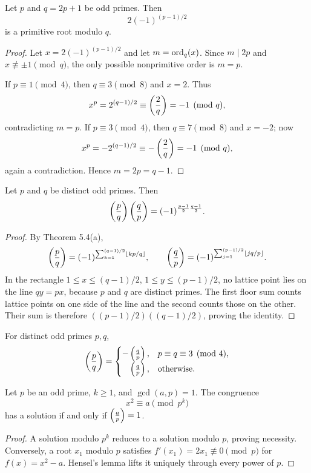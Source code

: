 \begin{thm}
Let $p$ and $q=2p+1$ be odd primes.  Then
\[
 2(-1)^{(p-1)/2}
\]
is a primitive root modulo $q$.
\end{thm}
\begin{proof}
Let $x=2(-1)^{(p-1)/2}$ and let $m=\operatorname{ord}_q(x)$.  Since $m\mid2p$ and $x\not\equiv\pm1\pmod q$, the only possible nonprimitive order is $m=p$.

If $p\equiv1\pmod4$, then $q\equiv3\pmod8$ and $x=2$.  Thus
\[
 x^p=2^{(q-1)/2}\equiv\left(\frac{2}{q}\right)=-1\pmod q,
\]
contradicting $m=p$.  If $p\equiv3\pmod4$, then $q\equiv7\pmod8$ and $x=-2$; now
\[
 x^p=-2^{(q-1)/2}\equiv-\left(\frac{2}{q}\right)=-1\pmod q,
\]
again a contradiction.  Hence $m=2p=q-1$.
\end{proof}

\begin{thm}
Let $p$ and $q$ be distinct odd primes.  Then
\[
 \left(\frac{p}{q}\right)\left(\frac{q}{p}\right)
 =(-1)^{\frac{p-1}{2}\frac{q-1}{2}}.
\]
\end{thm}
\begin{proof}
By Theorem 5.4(a),
\[
 \left(\frac{p}{q}\right)=(-1)^{\sum_{k=1}^{(q-1)/2}\left\lfloor kp/q \right\rfloor},
 \qquad
 \left(\frac{q}{p}\right)=(-1)^{\sum_{j=1}^{(p-1)/2}\left\lfloor jq/p \right\rfloor}.
\]
In the rectangle
$1\le x\le(q-1)/2$, $1\le y\le(p-1)/2$, no lattice point lies on the line $qy=px$, because $p$ and $q$ are distinct primes.  The first floor sum counts lattice points on one side of the line and the second counts those on the other.  Their sum is therefore
$((p-1)/2)((q-1)/2)$, proving the identity.
\end{proof}

\begin{cor}
For distinct odd primes $p,q$,
\[
 \left(\frac{p}{q}\right)=
 \begin{cases}
 -\left(\frac{q}{p}\right),&p\equiv q\equiv3\pmod4,\\
 \phantom{-}\left(\frac{q}{p}\right),&\text{otherwise}.
 \end{cases}
\]
\end{cor}

\begin{thm}
Let $p$ be an odd prime, $k\ge1$, and $\gcd(a,p)=1$.  The congruence
\[
 x^2\equiv a\pmod{p^k}
\]
has a solution if and only if $\left(\frac{a}{p}\right)=1$.
\end{thm}
\begin{proof}
A solution modulo $p^k$ reduces to a solution modulo $p$, proving necessity.  Conversely, a root $x_1$ modulo $p$ satisfies
$f'(x_1)=2x_1\not\equiv0\pmod p$ for $f(x)=x^2-a$.  Hensel's lemma lifts it uniquely through every power of $p$.
\end{proof}

